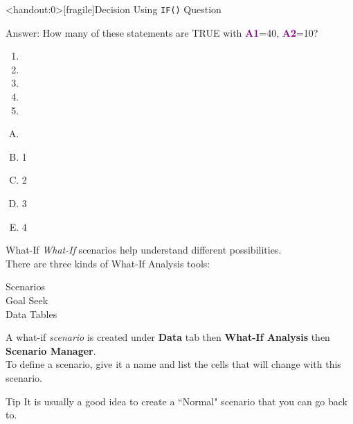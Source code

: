 \documentclass[xcolor=svgnames, handout]{beamer}
\newcommand{\cell}[1]{{\sf \textbf{\textcolor{DarkMagenta}{#1}}}}
\begin{document}
\begin{frame}<handout:0>[fragile]{Decision Using {\tt IF()} Question}
  \begin{block}{Answer:}
How many of these statements are TRUE with \cell{A1}=40, \cell{A2}=10?
 \begin{enumerate}
\item {}
\item {}
\item {}
\item {}
\item {}
 \end{enumerate}
\begin{multicols}{5}
\begin{enumerate}[A)]
\item \textbf<6>{\textit<6>{{}}}
\item 1
\item 2
\item 3
\item 4
\end{enumerate}
\end{multicols}
  \end{block} 
\end{frame}



\begin{frame}{What-If}
\emph{What-If} scenarios help understand different possibilities.\\[1em]
There are three kinds of What-If Analysis tools:
\begin{description}
\item[Scenarios]
\item [Goal Seek]
\item[Data Tables]
\end{description}

A what-if \emph{scenario} is created under {\bf Data} tab then {\bf What-If Analysis} then {\bf Scenario Manager}.\\[1em]
To define a scenario, give it a name and list the cells that will change with this scenario.
\vfill
\begin{alertblock}{Tip}
It is usually a good idea to create a ``Normal" scenario that you can go back to.
\end{alertblock}
\end{frame}
\end{document}
